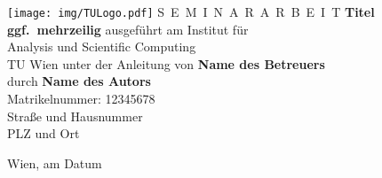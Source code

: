 \documentclass[a4paper,11pt,bibliography=totoc,listof=totoc,headinclude=true,cleardoublepage=empty,oneside]{scrbook}
\begin{document}


\begin{titlepage}
  \begin{center}
    \texttt{[image: img/TULogo.pdf]}
    \vskip 1cm%
    {\LARGE S~\Large E~M~I~N~A~R~A~R~B~E~I~T}
    \vskip 8mm
    {\huge\bfseries\color{change}Titel \\[1ex] ggf.\ mehrzeilig}
    \vskip 1cm
    \large 
    ausgef\"uhrt am    
    \vskip 0.75cm
    {\Large Institut f\"ur\\[1ex] Analysis und Scientific Computing}\\[1ex]
    {\Large TU Wien}
    \vskip0.75cm
    unter der Anleitung von
    \vskip0.75cm
    {\Large\bfseries\color{change}Name des Betreuers}\\[1ex]
    \vskip 0.5cm
    durch
    \vskip 0.5cm
    {\Large\bfseries\color{change}Name des Autors}\\[1ex]
    Matrikelnummer: {\color{change}12345678}\\[1ex]
    {\color{change}Straße und Hausnummer}\\[1ex]
    {\color{change}PLZ und Ort}
  \end{center}
  
  \vfill
  
  \small
  Wien, am {\color{change} Datum} %
  \vspace*{-15mm}
\end{titlepage}

\cleardoublepage



\tableofcontents

\cleardoublepage
{} 

\end{document}
